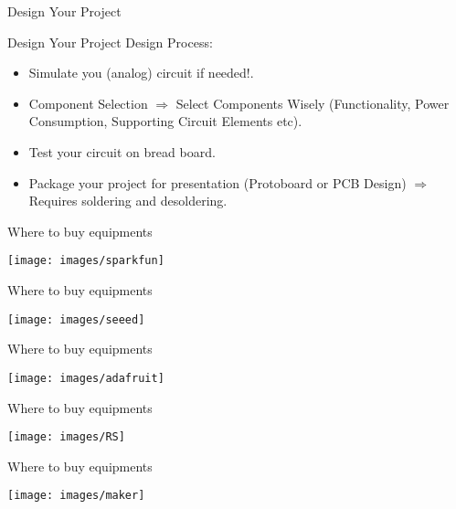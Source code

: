 \documentclass{beamer}
\begin{document}
\begin{darkframes}
\begin{frame}[<+->]{Design Your Project}
\begin{itemize}
	\end{itemize}
\end{frame}

\begin{frame}[<+->]{Design Your Project}
	Design Process:
	
	\begin{itemize}
		\item Simulate you (analog) circuit if needed!.
		\item Component Selection $\Rightarrow$ Select Components Wisely (Functionality, Power Consumption, Supporting Circuit Elements etc).
		\item Test your	circuit on bread board.
		\item Package your project for presentation (Protoboard or PCB Design) $\Rightarrow$ Requires soldering and desoldering.
	\end{itemize}
\end{frame}


\begin{frame}[<+->]{Where to buy equipments}
	\begin{center}
		\texttt{[image: images/sparkfun]} 
	\end{center}
\end{frame}

\begin{frame}[<+->]{Where to buy equipments}
	\begin{center}
		\texttt{[image: images/seeed]} 
	\end{center}
\end{frame}

\begin{frame}[<+->]{Where to buy equipments}
	\begin{center}
		\texttt{[image: images/adafruit]} 
	\end{center}
\end{frame}

\begin{frame}[<+->]{Where to buy equipments}
	\begin{center}
		\texttt{[image: images/RS]} 
	\end{center}
\end{frame}

\begin{frame}[<+->]{Where to buy equipments}
	\begin{center}
		\texttt{[image: images/maker]} 
	\end{center}
\end{frame}


\end{darkframes}
\end{document}
